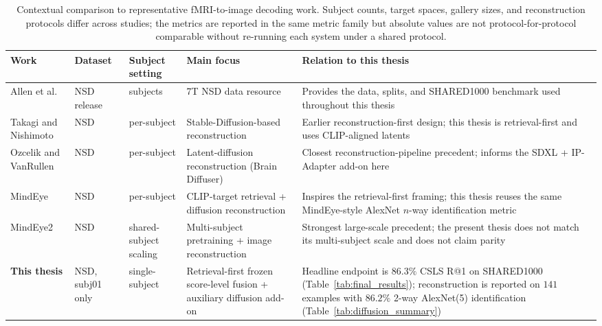 \begin{table}[htbp]
\centering
\footnotesize
\begin{tabularx}{\textwidth}{>{\raggedright\arraybackslash}p{2.5cm} >{\raggedright\arraybackslash}p{1.6cm} >{\raggedright\arraybackslash}p{2.3cm} >{\raggedright\arraybackslash}p{2.2cm} >{\raggedright\arraybackslash}X}
\toprule
\textbf{Work} & \textbf{Dataset} & \textbf{Subject setting} & \textbf{Main focus} & \textbf{Relation to this thesis} \\
\midrule
Allen et al. \cite{Allen2022} & NSD release & 8 subjects & 7T NSD data resource & Provides the data, splits, and SHARED1000 benchmark used throughout this thesis \\
Takagi and Nishimoto \cite{Takagi2023} & NSD & per-subject & Stable-Diffusion-based reconstruction & Earlier reconstruction-first design; this thesis is retrieval-first and uses CLIP-aligned latents \\
Ozcelik and VanRullen \cite{Ozcelik2023} & NSD & per-subject & Latent-diffusion reconstruction (Brain Diffuser) & Closest reconstruction-pipeline precedent; informs the SDXL + IP-Adapter add-on here \\
MindEye \cite{Scotti2023} & NSD & per-subject & CLIP-target retrieval + diffusion reconstruction & Inspires the retrieval-first framing; this thesis reuses the same MindEye-style AlexNet $n$-way identification metric \\
MindEye2 \cite{Scotti2024} & NSD & shared-subject scaling & Multi-subject pretraining + image reconstruction & Strongest large-scale precedent; the present thesis does not match its multi-subject scale and does not claim parity \\
\textbf{This thesis} & NSD, subj01 only & single-subject & Retrieval-first frozen score-level fusion + auxiliary diffusion add-on & Headline endpoint is $86.3\%$ CSLS R@1 on SHARED1000 (Table~\ref{tab:final_results}); reconstruction is reported on $141$ examples with $86.2\%$ 2-way AlexNet(5) identification (Table~\ref{tab:diffusion_summary}) \\
\bottomrule
\end{tabularx}
\caption{Contextual comparison to representative fMRI-to-image decoding work. Subject counts, target spaces, gallery sizes, and reconstruction protocols differ across studies; the metrics are reported in the same metric family but absolute values are not protocol-for-protocol comparable without re-running each system under a shared protocol.}
\label{tab:literature_comparison}
\end{table}


